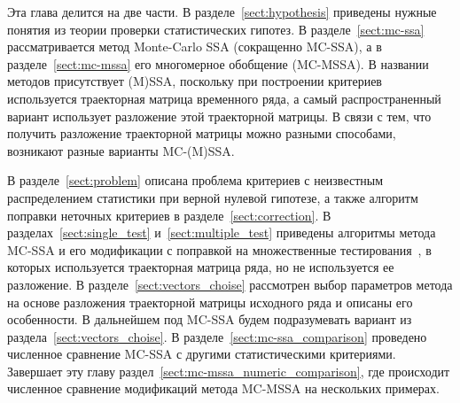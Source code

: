 \documentclass[specialist,
substylefile = spbu_report.rtx,
subf,href,colorlinks=true, 12pt]{disser}
\theoremstyle{definition}
\begin{document}
Эта глава делится на две части. В разделе~\ref{sect:hypothesis} приведены нужные понятия из теории проверки статистических гипотез. В разделе~\ref{sect:mc-ssa} рассматривается метод Monte-Carlo SSA (сокращенно MC-SSA), а в разделе~\ref{sect:mc-mssa} его многомерное обобщение (MC-MSSA). В названии методов присутствует (M)SSA, поскольку при построении критериев используется траекторная матрица временного ряда, а самый распространенный вариант использует разложение этой траекторной матрицы. В связи с тем, что получить разложение траекторной матрицы можно разными способами, возникают разные варианты MC-(M)SSA.

В разделе~\ref{sect:problem} описана проблема критериев с неизвестным распределением статистики при верной нулевой гипотезе, а также алгоритм поправки неточных критериев в разделе~\ref{sect:correction}. В разделах~\ref{sect:single_test} и~\ref{sect:multiple_test} приведены алгоритмы метода MC-SSA и его модификации с поправкой на множественные тестирования~\cite{Golyandina_2023}, в которых используется траекторная матрица ряда, но не используется ее разложение. В разделе~\ref{sect:vectors_choise} рассмотрен выбор параметров метода на основе разложения траекторной матрицы исходного ряда и описаны его особенности. В дальнейшем под MC-SSA будем подразумевать вариант из раздела~\ref{sect:vectors_choise}. В разделе~\ref{sect:mc-ssa_comparison} проведено численное сравнение MC-SSA с другими статистическими критериями. Завершает эту главу раздел~\ref{sect:mc-mssa_numeric_comparison}, где происходит численное сравнение модификаций метода MC-MSSA на нескольких примерах.
\end{document}
